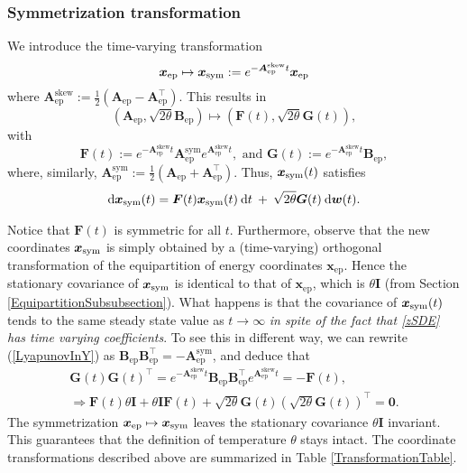 \documentclass[letterpaper,10pt,twocolumn,conference]{ieeeconf}
\newcommand{\bbw}{\bm{w}}
\newcommand{\bbx}{{\bm{x}}}
\newcommand{\sym}{^{\mathrm{sym}}}
\newcommand{\skewsym}{^{\mathrm{skew}}}
\newcommand{\ep}{_{\mathrm{ep}}}
\newcommand{\bbA}{\bm{A}}
\newcommand{\bbB}{\bm{B}}
\newcommand{\bbI}{\bm{I}}
\newcommand{\bbF}{\bm{F}}
\newcommand{\bbG}{\bm{G}}
\begin{document}
\subsubsection{Symmetrization transformation}\label{SymmetrizationSubsubsection}
We introduce the time-varying transformation
\[
\bbx\ep \mapsto \bbx_{\rm{sym}} := e^{-\bbA\ep\skewsym t} \bbx\ep
\]
where $\bbA\ep\skewsym := \frac{1}{2}(\bbA\ep - \bbA\ep^{\top})$. This results in
\[
(\bbA\ep,\sqrt{2\theta}\bbB\ep) \mapsto (\bbF(t),\sqrt{2\theta}\bbG(t)),
\]
with 
\[
\bbF(t) := e^{-\bbA\ep\skewsym t} \bbA\ep\sym e^{\bbA\ep\skewsym t},\mbox{ and }\bbG(t) := e^{-\bbA\ep\skewsym t} \bbB\ep,
\]
where, similarly, $\bbA\ep\sym := \frac{1}{2}(\bbA\ep + \bbA\ep^{\top})$.
Thus, $\bbx_{\rm{sym}}(t)$ satisfies
\begin{eqnarray}
\mathrm{d}\bbx_{\rm{sym}}(t) = \bbF(t)\bbx_{\rm{sym}}(t) \:\mathrm{d}t \: + \: \sqrt{2\theta}\bbG(t)\:\mathrm{d}\bbw(t).
\label{zSDE}	
\end{eqnarray}

Notice that $\bbF(t)$ is symmetric for all $t$. Furthermore, observe that the new coordinates $\bbx_{\rm{sym}}$ is simply obtained by a (time-varying) orthogonal transformation of the equipartition of energy coordinates $\bbx\ep$. Hence the stationary covariance of $\bbx_{\rm{sym}}$ is identical to that of $\bbx\ep$, which is $\theta\bbI$ (from Section \ref{EquipartitionSubsubsection}). What happens is that the covariance of $\bbx_{\rm{sym}}(t)$ tends to the same steady state value as $t\to\infty$ {\em in spite of the fact that \eqref{zSDE} has time varying coefficients}.
To see this in different way, we can rewrite (\ref{LyapunovInY}) as $\bbB\ep\bbB\ep^{\top} = - \bbA\ep\sym$, and deduce that
\begin{eqnarray}
\bbG(t)\bbG(t)^{\top} = e^{-\bbA\ep\skewsym t} \bbB\ep\bbB\ep^{\top} e^{\bbA\ep\skewsym t} = - \bbF(t),\nonumber\\
\Rightarrow \bbF(t)\theta\bbI + \theta\bbI\bbF(t) + \sqrt{2\theta}\bbG(t)(\sqrt{2\theta}\bbG(t))^{\top}=\bm{0}.
\label{DeducingLyapunovInZ}	
\end{eqnarray}
The symmetrization $\bbx\ep \mapsto \bbx_{\rm{sym}}$ leaves the stationary covariance $\theta\bbI$ invariant. This guarantees that the definition of temperature $\theta$ stays intact. The coordinate transformations described above are summarized in Table \ref{TransformationTable}.
\end{document}
